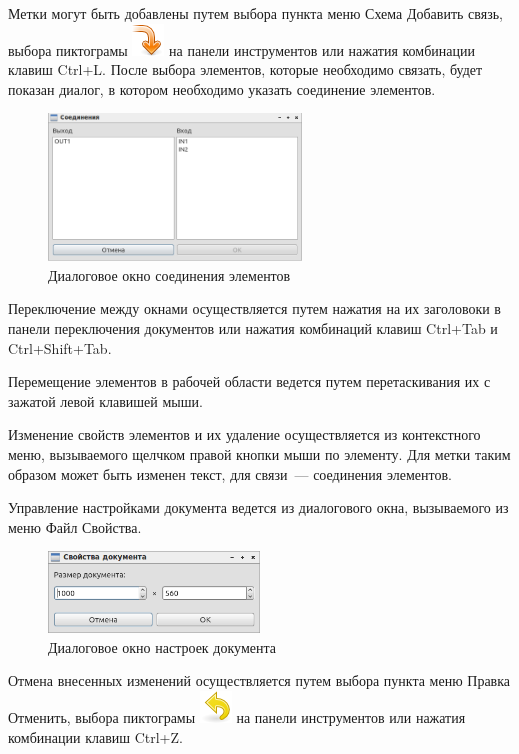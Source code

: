 Метки могут быть добавлены путем выбора пункта меню Схема \rarr Добавить связь, выбора пиктограмы \includegraphics[scale=0.5]{gui/icons/scheme-add-link.png} на панели инструментов или нажатия комбинации клавиш Ctrl+L.
После выбора элементов, которые необходимо связать, будет показан диалог, в котором необходимо указать соединение элементов.
\begin{figure}[H]
  \centering
  \includegraphics[width=0.6\textwidth]{gui/add-link.png}
  \caption{Диалоговое окно соединения элементов}
\end{figure}

Переключение между окнами осуществляется путем нажатия на их заголовоки в панели переключения документов или нажатия комбинаций клавиш Ctrl+Tab и Ctrl+Shift+Tab.

Перемещение элементов в рабочей области ведется путем перетаскивания их с зажатой левой клавишей мыши.

Изменение свойств элементов и их удаление осуществляется из контекстного меню, вызываемого щелчком правой кнопки мыши по элементу.
Для метки таким образом может быть изменен текст, для связи~--- соединения элементов.

Управление настройками документа ведется из диалогового окна, вызываемого из меню Файл \rarr Свойства.
\begin{figure}[H]
  \centering
  \includegraphics[width=0.5\textwidth]{gui/options.png}
  \caption{Диалоговое окно настроек документа}
\end{figure}

Отмена внесенных изменений осуществляется путем выбора пункта меню Правка \rarr Отменить, выбора пиктограмы \includegraphics[scale=0.5]{gui/icons/edit-undo.png} на панели инструментов или нажатия комбинации клавиш Ctrl+Z.


